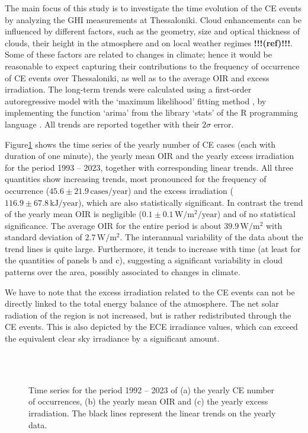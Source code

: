 \documentclass[preprint, 5p,
authoryear]{elsarticle} %
\begin{document}
The main focus of this study is to investigate the time evolution of the
CE events by analyzing the GHI measurements at Thessaloniki. Cloud
enhancements can be influenced by different factors, such as the
geometry, size and optical thickness of clouds, their height in the
atmosphere and on local weather regimes \textbf{!!!(ref)!!!}. Some of
these factors are related to changes in climate; hence it would be
reasonable to expect capturing their contributions to the frequency of
occurrence of CE events over Thessaloniki, as well as to the average OIR
and excess irradiation. The long-term trends were calculated using a
first-order autoregressive model with the `maximum likelihood' fitting
method \citep{Gardner1980, Jones1980}, by implementing the function
`arima' from the library `stats' of the R programming language
\citep{RCT2023}. All trends are reported together with their \(2\sigma\)
error.

Figure\nobreakspace{}\ref{fig:P-energy} shows the time series of the
yearly number of CE cases (each with duration of one minute), the yearly
mean OIR and the yearly excess irradiation for the period 1993 -- 2023,
together with corresponding linear trends. All three quantities show
increasing trends, most pronounced for the frequency of occurrence
(\(45.6\pm 21.9\,\text{cases}/\text{year}\)) and the excess irradiation
(\(116.9\pm 67.8\,\text{kJ}/\text{year}\)), which are also statistically
significant. In contrast the trend of the yearly mean OIR is negligible
(\(0.1\pm 0.1\,\text{W}/\text{m}^2/\text{year}\)) and of no statistical
significance. The average OIR for the entire period is about
\(39.9\,\text{W}/\text{m}^2\) with standard deviation of
\(2.7\,\text{W}/\text{m}^2\). The interannual variability of the data
about the trend lines is quite large. Furthermore, it tends to increase
with time (at least for the quantities of panels b and c), suggesting a
significant variability in cloud patterns over the area, possibly
associated to changes in climate.

We have to note that the excess irradiation related to the CE events can
not be directly linked to the total energy balance of the atmosphere.
The net solar radiation of the region is not increased, but is rather
redistributed through the CE events. This is also depicted by the ECE
irradiance values, which can exceed the equivalent clear sky irradiance
by a significant amount.

\begin{figure}%
        {\centering 
            \\
            \\
        }
    \caption{Time series for the period 1992 -- 2023 of (a) the yearly CE number of occurrences, (b) the yearly mean OIR and (c) the yearly excess irradiation. The black lines represent the linear trends on the yearly data.}\label{fig:P-energy}
\end{figure}
\end{document}
